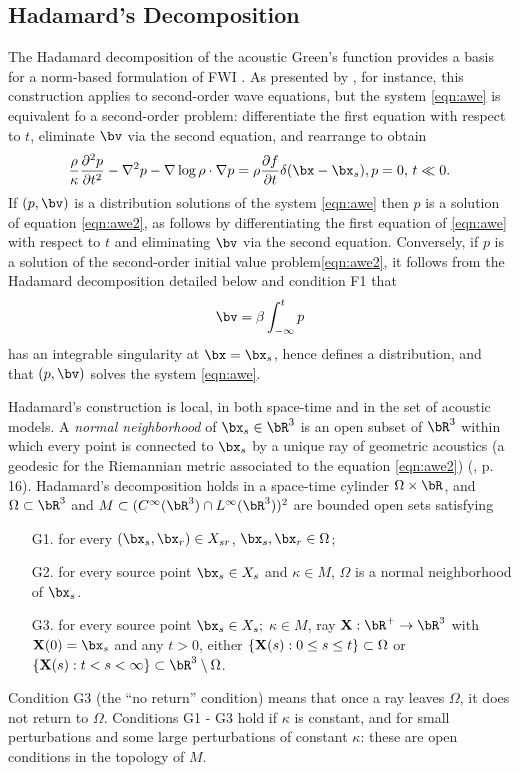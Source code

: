 \subsection{Hadamard's Decomposition}
The Hadamard decomposition of the acoustic Green's function provides a
basis for a norm-based formulation of FWI \cite[]{Friedlander:75,Qian:JCP24}. As presented by
\cite{Friedlander:75}, for instance, this construction applies to
second-order wave equations, but the system \ref{eqn:awe} is
equivalent fo a second-order problem: differentiate the first equation
with respect to $t$, eliminate $\bv$ via the second equation, and
rearrange to obtain
\begin{equation}
  \label{eqn:awe2}
  \frac{\rho}{\kappa}\frac{\partial^2 p}{\partial t^2} - \nabla^2 p -
  \nabla \log \rho \cdot \nabla p = \rho \frac{\partial f}{\partial t}
  \delta(\bx-\bx_s), \nonumber \\
  p=0, \, t \ll 0.
\end{equation}
If $(p,\bv)$ is a distribution solutions of the system
\ref{eqn:awe} then $p$ is a solution of equation
\ref{eqn:awe2}, as follows by differentiating the first equation of
\ref{eqn:awe} with respect to $t$ and eliminating $\bv$ via the second
equation. Conversely, if $p$ is a solution of the second-order initial
value problem\ref{eqn:awe2}, it follows from the Hadamard
decomposition detailed below and condition F1
that 
\[
  \bv = \beta \int_{-\infty}^t p
\]
has an
integrable singularity at $\bx=\bx_s$, hence 
defines a distribution, and that $(p,\bv)$ solves the system \ref{eqn:awe}.

Hadamard's construction is local, in both space-time and in the set of
acoustic models. A {\em normal neighborhood} of
$\bx_s \in \bR^3$ is an open subset of $\bR^3$ 
within which every point is connected to $\bx_s$ by  a unique ray of
geometric acoustics (a geodesic for the Riemannian metric associated
to the equation \ref{eqn:awe2}) (\cite{Friedlander:75},
p. 16). Hadamard's decomposition holds in a space-time cylinder
$\Omega \times \bR$,  and $\Omega\subset \bR^3$ 
and $M \subset (C^{\infty}(\bR^3) \cap L^{\infty}(\bR^3))^2$ are bounded open sets satisfying 
\begin{itemize}
  \item[G1. ] for every $(\bx_s,\bx_r) \in X_{sr}$, $\bx_s, \bx_r \in \Omega$;
  \item[G2. ] for every source point $\bx_s\in X_{s}$ and $\kappa \in M$, $\Omega$ is a
    normal neighborhood of $\bx_s$.
  \item[G3. ] for every source point $\bx_s \in X_{s};$
    $\kappa \in M$, ray ${\bf X}:\bR^+\rightarrow \bR^3$
    with ${\bf X}(0)=\bx_s$ and any $t>0$, either $\{{\bf X}(s): 0\le s \le t\} \subset \Omega$
    or $\{{\bf X}(s): t < s < \infty\} \subset \bR^3 \setminus \Omega$.
  \end{itemize}
Condition G3 (the ``no return'' condition) means that once a ray
leaves $\Omega$, it does not return to $\Omega$. Conditions G1 - G3
hold if $\kappa$ is constant, and for small perturbations and some
large perturbations of constant $\kappa$: these are open conditions in
the topology of $M$.

